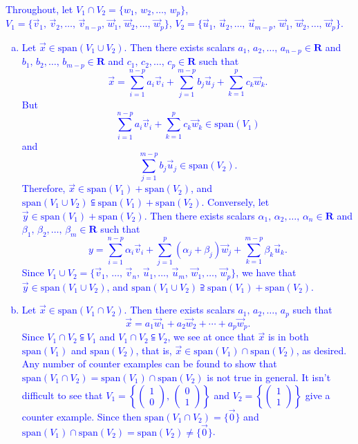 \documentclass[a4paper,11pt]{article}
\newcommand{\R}{\mathbf{R}}
\newcommand{\BB}[1]{\textcolor{blue}{#1}}
\begin{document}
\BB{
  Throughout, let $V_1 \cap V_2 = \{w_1,\,w_2,\dots,\,w_p\}$,
  $V_1=\{\vec v_1,\,\vec v_2,\dots,\,\vec v_{n-p},\,\vec w_1,\,\vec
  w_2,\dots,\,\vec w_p\}$, $V_2=\{\vec u_1,\,\vec u_2,\dots,\,\vec
  u_{m-p},\,\vec w_1,\,\vec w_2,\dots,\,\vec w_p\}$.
  \begin{enumerate}[(a)]
  \item Let $\vec x \in \text{span}(V_1 \cup V_2)$. Then there exists scalars
    $a_1,\,a_2,\dots,\,a_{n-p} \in \R$ and $b_1,\,b_2,\dots,\,b_{m-p} \in \R$
    and $c_1,\,c_2,\dots,\,c_p \in \R$ such that 
    \[
      \vec x = \sum_{i=1}^{n-p}a_i\vec v_i + \sum_{j=1}^{m-p}b_j\vec u_j +
      \sum_{k=1}^pc_k\vec w_k.
    \]
    But
    \[
      \sum_{i=1}^{n-p}a_i\vec v_i + \sum_{k=1}^pc_k\vec w_k \in \text{span}(V_1)
    \]
    and
    \[
      \sum_{j=1}^{m-p}b_j\vec u_j \in \text{span}(V_2).
    \]
    Therefore, $\vec x \in \text{span}(V_1)+\text{span}(V_2)$, and
    $\text{span}(V_1 \cup V_2) \subseteqq \text{span}(V_1)+\text{span}(V_2)$.
    Conversely, let $\vec y \in \text{span}(V_1)+\text{span}(V_2)$. Then there
    exists scalars $\alpha_1,\,\alpha_2,\dots,\,\alpha_n \in \R$ and
    $\beta_1,\,\beta_2,\dots,\,\beta_m \in \R$ such that
    \[
      y = \sum_{i=1}^{n-p}\alpha_i\vec v_i +
      \sum_{j=1}^p(\alpha_j+\beta_j)\vec w_j +
      \sum_{k=1}^{m-p}\beta_k\vec u_k.
    \]
    Since $V_1 \cup V_2=\{\vec v_1,\,\dots,\,\vec v_n,\,\vec u_1,\dots,\,\vec
    u_m,\,\vec w_1,\dots,\,\vec w_p\}$, we have that $\vec y \in \text{span}(V_1
    \cup V_2)$, and $\text{span}(V_1 \cup V_2) \supseteqq
    \text{span}(V_1)+\text{span}(V_2)$.
  \item Let $\vec x \in \text{span}(V_1 \cap V_2)$. Then there exists scalars
    $a_1,\,a_2,\dots,\,a_p$ such that
    \[
      \vec x = a_1\vec w_1 + a_2\vec w_2 + \cdots + a_p\vec w_p.
    \]
    Since $V_1 \cap V_2 \subseteqq V_1$ and $V_1 \cap V_2 \subseteqq V_2$, we
    see at once that $\vec x$ is in both $\text{span}(V_1)$ and
    $\text{span}(V_2)$, that is, $\vec x \in
    \text{span}(V_1)\cap\text{span}(V_2)$, as desired. Any number of counter
    examples can be found to show that $\text{span}(V_1 \cap V_2) =
    \text{span}(V_1) \cap \text{span}(V_2)$ is not true in general. It isn't
    difficult to see that $V_1=\left\{
      \left( \begin{smallmatrix}1\\0\end{smallmatrix}
      \right),\,\left( \begin{smallmatrix}0\\1\end{smallmatrix} \right)
    \right\}$  and $V_2=\left\{
      \left( \begin{smallmatrix}1\\1\end{smallmatrix} \right) \right\}$ give
    a counter example. Since then $\text{span}(V_1 \cap V_2)=\{\vec 0\}$ and
    $\text{span}(V_1)\cap\text{span}(V_2)=\text{span}(V_2) \neq \{\vec 0\}$.
  \end{enumerate}
}
\end{document}
